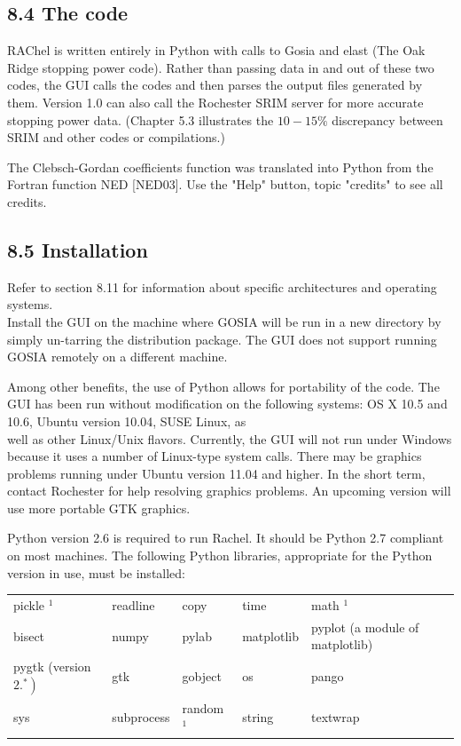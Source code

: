 \documentclass[10pt]{article}
\begin{document}
\subsection*{8.4 The code}
RAChel is written entirely in Python with calls to Gosia and elast (The Oak Ridge stopping power code). Rather than passing data in and out of these two codes, the GUI calls the codes and then parses the output files generated by them. Version 1.0 can also call the Rochester SRIM server for more accurate stopping power data. (Chapter 5.3 illustrates the $10-15 \%$ discrepancy between SRIM and other codes or compilations.)

The Clebsch-Gordan coefficients function was translated into Python from the Fortran function NED [NED03]. Use the "Help" button, topic "credits" to see all credits.

\subsection*{8.5 Installation}
Refer to section 8.11 for information about specific architectures and operating systems.\\
Install the GUI on the machine where GOSIA will be run in a new directory by simply un-tarring the distribution package. The GUI does not support running GOSIA remotely on a different machine.

Among other benefits, the use of Python allows for portability of the code. The GUI has been run without modification on the following systems: OS X 10.5 and 10.6, Ubuntu version 10.04, SUSE Linux, as\\
well as other Linux/Unix flavors. Currently, the GUI will not run under Windows because it uses a number of Linux-type system calls. There may be graphics problems running under Ubuntu version 11.04 and higher. In the short term, contact Rochester for help resolving graphics problems. An upcoming version will use more portable GTK graphics.

Python version 2.6 is required to run Rachel. It should be Python 2.7 compliant on most machines. The following Python libraries, appropriate for the Python version in use, must be installed:

\begin{center}
\begin{tabular}{lllll}
pickle $^{1}$ & readline & copy & time & math $^{1}$ \\
bisect & numpy & pylab & matplotlib & pyplot (a module of matplotlib) \\
pygtk (version $\left.2 .^{*}\right)$ & gtk & gobject & os & pango \\
sys & subprocess & random ${ }^{1}$ & string & textwrap \\
\end{tabular}
\end{center}
\end{document}
